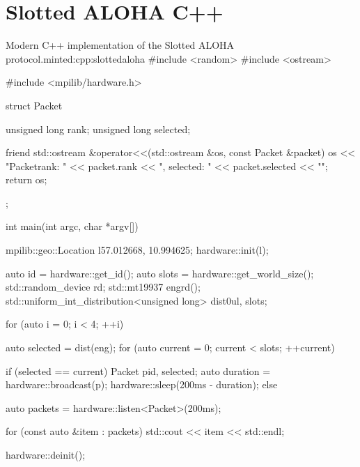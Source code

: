 \chapter{Slotted ALOHA C++}\label{app:slottedaloha}
\begin{cpp}{Modern C++ implementation of the Slotted ALOHA protocol.}{minted:cpp:slottedaloha}
#include <random>
#include <ostream>

#include <mpilib/hardware.h>

struct Packet {
    unsigned long rank{};
    unsigned long selected{};

    friend std::ostream &operator<<(std::ostream &os, const Packet &packet) {
        os << "Packet{rank: " << packet.rank << ", selected: " << packet.selected << "}";
        return os;
    }
};

int main(int argc, char *argv[]) {
    mpilib::geo::Location l{57.012668, 10.994625};
    hardware::init(l);

    auto id = hardware::get_id();
    auto slots = hardware::get_world_size();
    std::random_device rd{};
    std::mt19937 eng{rd()};
    std::uniform_int_distribution<unsigned long> dist{0ul, slots};

    for (auto i = 0; i < 4; ++i) {
        auto selected = dist(eng);
        for (auto current = 0; current < slots; ++current) {
            if (selected == current) {
                Packet p{id, selected};
                auto duration = hardware::broadcast(p);
                hardware::sleep(200ms - duration);
            } else {
                auto packets = hardware::listen<Packet>(200ms);
                
                for (const auto &item : packets) {
                    std::cout << item << std::endl;    
                }
            }
        }
    }

    hardware::deinit();
}
\end{cpp}